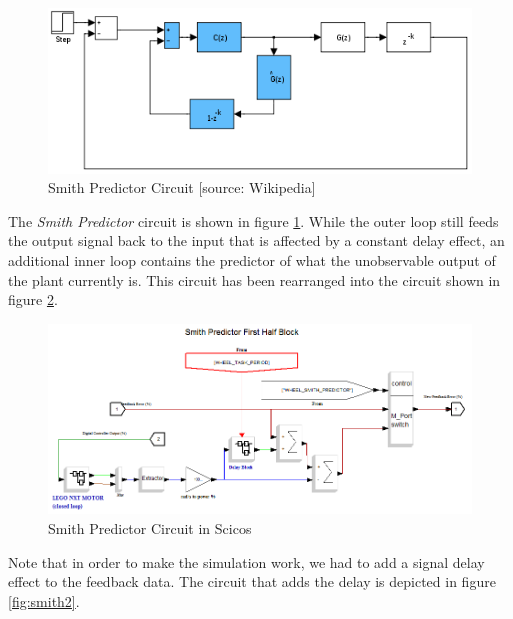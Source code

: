 \begin{figure}[H]
\center
  \includegraphics[scale=0.51]{FIGURES_3/smith.png}
  \caption[SOSModel]{Smith Predictor Circuit [source: Wikipedia]}
  \label{fig:smith}
\end{figure}

The \textit{Smith Predictor} circuit is shown in figure \ref{fig:smith}. While the outer loop still feeds the output signal back to the input that is affected by a constant delay effect, an additional inner loop contains the predictor of what the unobservable output of the plant currently is. This circuit has been rearranged into the circuit shown in figure \ref{fig:smith1}.

\begin{figure}[H]
\center
  \includegraphics[scale=0.49]{FIGURES_3/Wheel_SmithPredictor_01.png}
  \caption[SOSModel]{Smith Predictor Circuit in Scicos}
  \label{fig:smith1}
\end{figure}

Note that in order to make the simulation work, we had to add a signal delay effect to the feedback data. The circuit that adds the delay is depicted in figure \ref{fig:smith2}.

